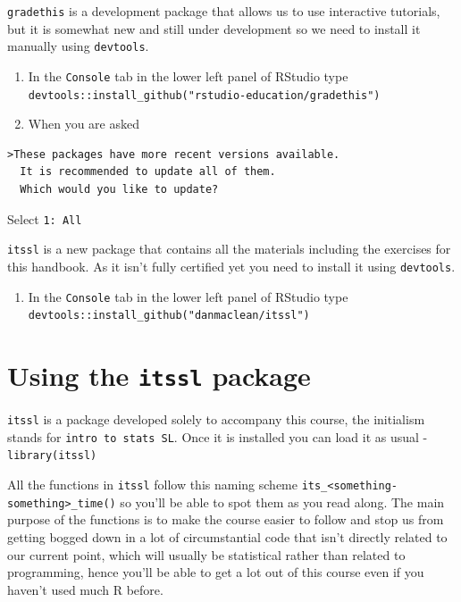 \documentclass[
]{book}
\providecommand{\tightlist}{%
  \setlength{\itemsep}{0pt}\setlength{\parskip}{0pt}}
\begin{document}
\texttt{gradethis} is a development package that allows us to use interactive tutorials, but it is somewhat new and still under development so we need to install it manually using \texttt{devtools}.

\begin{enumerate}
\def\labelenumi{\arabic{enumi}.}
\tightlist
\item
  In the \texttt{Console} tab in the lower left panel of RStudio type \texttt{devtools::install\_github("rstudio-education/gradethis")}
\item
  When you are asked
\end{enumerate}

\begin{verbatim}
>These packages have more recent versions available.
  It is recommended to update all of them.
  Which would you like to update?
\end{verbatim}

Select \texttt{1:\ All}

\texttt{itssl} is a new package that contains all the materials including the exercises for this handbook. As it isn't fully certified yet you need to install it using \texttt{devtools}.

\begin{enumerate}
\def\labelenumi{\arabic{enumi}.}
\tightlist
\item
  In the \texttt{Console} tab in the lower left panel of RStudio type \texttt{devtools::install\_github("danmaclean/itssl")}
\end{enumerate}

\hypertarget{using-the-itssl-package}{%
\section{\texorpdfstring{Using the \texttt{itssl} package}{Using the itssl package}}\label{using-the-itssl-package}}

\texttt{itssl} is a package developed solely to accompany this course, the initialism stands for \texttt{intro\ to\ stats\ SL}. Once it is installed you can load it as usual - \texttt{library(itssl)}

All the functions in \texttt{itssl} follow this naming scheme \texttt{its\_\textless{}something-something\textgreater{}\_time()} so you'll be able to spot them as you read along. The main purpose of the functions is to make the course easier to follow and stop us from getting bogged down in a lot of circumstantial code that isn't directly related to our current point, which will usually be statistical rather than related to programming, hence you'll be able to get a lot out of this course even if you haven't used much R before.
\end{document}

